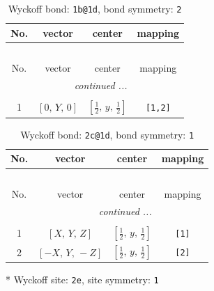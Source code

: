 \documentclass[fleqn,8pt]{jsarticle}
\begin{document}
\begin{longtable}{cccc}
\caption{Wyckoff bond: {\tt 1b@1d}, bond symmetry: {\tt 2}}
 \\
 \hline \hline
No. & vector & center & mapping \\ \hline \endfirsthead

\multicolumn{3}{l}{\tablename\ \thetable{}} \\
 \hline \hline
No. & vector & center & mapping \\ \hline \endhead

 \hline \hline
\multicolumn{3}{r}{\footnotesize\it continued ...} \\ \endfoot

 \hline \hline
\multicolumn{3}{r}{} \\ \endlastfoot

1 & $\left[ 0,\, Y,\, 0 \right]$ & $\left[ \frac{1}{2},\, y,\, \frac{1}{2} \right]$ & {\tt [1,2]} \\
\end{longtable}
\renewcommand{\arraystretch}{1.2}
\begin{longtable}{cccc}
\caption{Wyckoff bond: {\tt 2c@1d}, bond symmetry: {\tt 1}}
 \\
 \hline \hline
No. & vector & center & mapping \\ \hline \endfirsthead

\multicolumn{3}{l}{\tablename\ \thetable{}} \\
 \hline \hline
No. & vector & center & mapping \\ \hline \endhead

 \hline \hline
\multicolumn{3}{r}{\footnotesize\it continued ...} \\ \endfoot

 \hline \hline
\multicolumn{3}{r}{} \\ \endlastfoot

1 & $\left[ X,\, Y,\, Z \right]$ & $\left[ \frac{1}{2},\, y,\, \frac{1}{2} \right]$ & {\tt [1]} \\ \hline
2 & $\left[ - X,\, Y,\, - Z \right]$ & $\left[ \frac{1}{2},\, y,\, \frac{1}{2} \right]$ & {\tt [2]} \\
\end{longtable}
* Wyckoff site: {\tt 2e}, site symmetry: {\tt 1}
\renewcommand{\arraystretch}{1.2}
\end{document}
